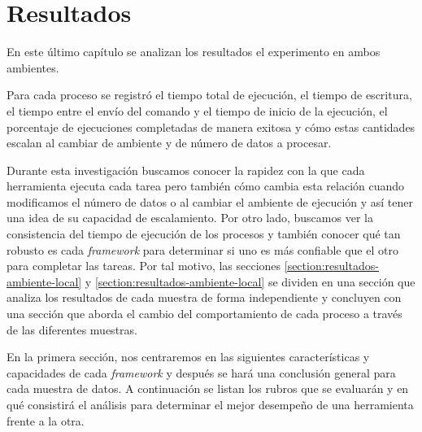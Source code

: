 \chapter{Resultados}

\noindent En este último capítulo se analizan los resultados el experimento en ambos ambientes. 

Para cada proceso se registró el tiempo total de ejecución, el tiempo de escritura, el tiempo entre el envío del comando y el tiempo de inicio de la ejecución, el porcentaje de ejecuciones completadas de manera exitosa y cómo estas cantidades escalan al cambiar de ambiente y de número de datos a procesar.

Durante esta investigación buscamos conocer la rapidez con la que cada herramienta ejecuta cada tarea pero también cómo cambia esta relación cuando modificamos el número de datos o al cambiar el ambiente de ejecución y así tener una idea de su capacidad de escalamiento. Por otro lado, buscamos ver la consistencia del tiempo de ejecución de los procesos y también conocer qué tan robusto es cada \textit{framework} para determinar si uno es más confiable que el otro para completar las tareas. Por tal motivo, las secciones \ref{section:resultados-ambiente-local} y \ref{section:resultados-ambiente-local} se dividen en una sección que analiza los resultados de cada muestra de forma independiente y concluyen con una sección que aborda el cambio del comportamiento de cada proceso a través de las diferentes muestras.

En la primera sección, nos centraremos en las siguientes características y capacidades de cada \textit{framework} y después se hará una conclusión general para cada muestra de datos. A continuación se listan los rubros que se evaluarán y en qué consistirá el análisis para determinar el mejor desempeño de una herramienta frente a la otra.

